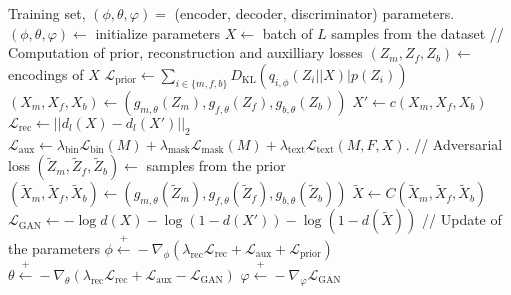 \begin{algorithmic}[1]
\Require Training set, $(\phi, \theta, \varphi) = $ (encoder, decoder, discriminator) parameters.
\State $(\phi, \theta, \varphi)  \leftarrow $ initialize parameters
\State $X \leftarrow $ batch of $L$ samples from the dataset
\State // Computation of prior, reconstruction and auxilliary losses
\State $(Z_m, Z_f, Z_b) \leftarrow $ encodings of $X$
\State $\mathcal{L}_{\text{prior}} \leftarrow \sum_{i \in \lbrace m, f, b \rbrace} D_\text{KL} (q_{i,\phi} (Z_i \vert \vert X) \vert p(Z_i))$  
\State $(X_m,X_f,X_b) \leftarrow (g_{m, \theta}(Z_m), g_{f, \theta}(Z_f), g_{b, \theta}(Z_b))$ 
\State $X' \leftarrow c(X_m,X_f,X_b)$
\State $\mathcal{L}_{\text{rec}} \leftarrow \vert \vert d_l(X) - d_l(X') \vert \vert_2$
\State $\mathcal{L}_{\text{aux}} \leftarrow \lambda_{\text{bin}}\mathcal{L}_{\text{bin}}(M) + \lambda_{\text{mask}}\mathcal{L}_{\text{mask}}(M) + \lambda_{\text{text}}\mathcal{L}_{\text{text}}(M,F,X).$
\State // Adversarial loss 
\State $(\tilde{Z}_m, \tilde{Z}_f, \tilde{Z}_b) \leftarrow $ samples from the prior
\State $(\tilde{X}_m,\tilde{X}_f,\tilde{X}_b) \leftarrow (g_{m, \theta}(\tilde{Z}_m), g_{f, \theta}(\tilde{Z}_f), g_{b, \theta}(\tilde{Z}_b))$ 
\State $\tilde{X} \leftarrow C(\tilde{X}_m,\tilde{X}_f,\tilde{X}_b)$
\State $\mathcal{L}_{\text{GAN}} \leftarrow - \log d(X) - \log (1 - d(X')) - \log (1-d(\tilde{X}))$
\State // Update of the parameters
\State $\phi \stackrel{+}\leftarrow -\nabla_{\phi} (\lambda_{\text{rec}} \mathcal{L}_{\text{rec}} + \mathcal{L}_{\text{aux}} + \mathcal{L}_{\text{prior}})$
\State $\theta \stackrel{+}\leftarrow -\nabla_{\theta} (\lambda_{\text{rec}} \mathcal{L}_{\text{rec}} + \mathcal{L}_{\text{aux}} - \mathcal{L}_{\text{GAN}})$
\State $\varphi \stackrel{+}\leftarrow -\nabla_{\varphi} \mathcal{L}_{\text{GAN}}$
\EndWhile
\end{algorithmic}
